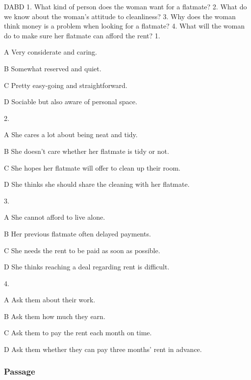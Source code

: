 \begin{enumerate}
	DABD
	1. What kind of person does the woman want for a flatmate?
	2. What do we know about the woman's attitude to cleanliness?
	3. Why does the woman think money is a problem when looking for a flatmate?
	4. What will the woman do to make sure her flatmate can afford the rent?
	1.
	
	A
	Very considerate and caring.
	
	B
	Somewhat reserved and quiet.
	
	C
	Pretty easy-going and straightforward.
	
	D
	Sociable but also aware of personal space.
	
	2.
	
	A
	She cares a lot about being neat and tidy.
	
	B
	She doesn't care whether her flatmate is tidy or not.
	
	C
	She hopes her flatmate will offer to clean up their room.
	
	D
	She thinks she should share the cleaning with her flatmate.
	
	3.
	
	A
	She cannot afford to live alone.
	
	B
	Her previous flatmate often delayed payments.
	
	C
	She needs the rent to be paid as soon as possible.
	
	D
	She thinks reaching a deal regarding rent is difficult.
	
	4.
	
	A
	Ask them about their work.
	
	B
	Ask them how much they earn.
	
	C
	Ask them to pay the rent each month on time.
	
	D
	Ask them whether they can pay three months' rent in advance.
\end{enumerate}


\subsubsection{Passage}

